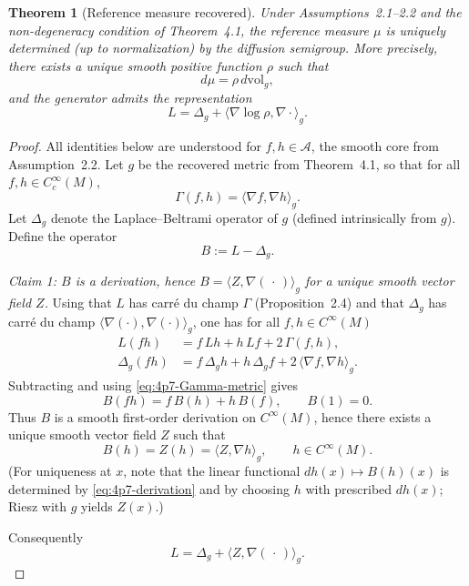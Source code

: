 \documentclass[11pt]{amsart}
\newtheorem{theorem}{Theorem}[section]
\theoremstyle{definition}
\theoremstyle{remark}
\begin{document}
\begin{theorem}[Reference measure recovered]\label{thm:recover-measure}
Under Assumptions~2.1--2.2 and the non-degeneracy condition of Theorem~4.1,
the reference measure $\mu$ is uniquely determined (up to normalization) by the
diffusion semigroup.
More precisely, there exists a unique smooth positive function $\rho$ such that
\[
d\mu = \rho\,d\mathrm{vol}_g,
\]
and the generator admits the representation
\[
L = \Delta_g + \langle\nabla\log\rho,\nabla\cdot\rangle_g.
\]
\end{theorem}
\begin{proof} All identities below are understood for $f,h\in\mathcal A$, the smooth core from Assumption~2.2.
Let $g$ be the recovered metric from Theorem~4.1, so that for all $f,h\in C_c^\infty(M)$,
\begin{equation}\label{eq:4p7-Gamma-metric}
\Gamma(f,h)=\langle \nabla f,\nabla h\rangle_g .
\end{equation}
Let $\Delta_g$ denote the Laplace--Beltrami operator of $g$ (defined intrinsically from $g$).
Define the operator
\[
B := L-\Delta_g .
\]

\smallskip
\noindent\emph{Claim 1: $B$ is a derivation, hence $B=\langle Z,\nabla(\,\cdot\,)\rangle_g$ for a unique smooth vector field $Z$.}
Using that $L$ has carré du champ $\Gamma$ (Proposition~2.4) and that $\Delta_g$ has carré du champ
$\langle \nabla(\cdot),\nabla(\cdot)\rangle_g$, one has for all $f,h\in C^\infty(M)$
\begin{align*}
L(fh) &= f\,Lh + h\,Lf + 2\,\Gamma(f,h),\\
\Delta_g(fh) &= f\,\Delta_g h + h\,\Delta_g f + 2\,\langle \nabla f,\nabla h\rangle_g .
\end{align*}
Subtracting and using \eqref{eq:4p7-Gamma-metric} gives
\begin{equation}\label{eq:4p7-derivation}
B(fh)=f\,B(h)+h\,B(f),
\qquad
B(1)=0.
\end{equation}
Thus $B$ is a smooth first-order derivation on $C^\infty(M)$, hence there exists a unique smooth
vector field $Z$ such that
\begin{equation}\label{eq:4p7-Z-def}
B(h)=Z(h)=\langle Z,\nabla h\rangle_g,\qquad h\in C^\infty(M).
\end{equation}
(For uniqueness at $x$, note that the linear functional $dh(x)\mapsto B(h)(x)$ is determined by \eqref{eq:4p7-derivation}
and by choosing $h$ with prescribed $dh(x)$; Riesz with $g$ yields $Z(x)$.)

Consequently
\begin{equation}\label{eq:4p7-L-split}
L=\Delta_g+\langle Z,\nabla(\,\cdot\,)\rangle_g .
\end{equation}


\end{proof}
\end{document}
